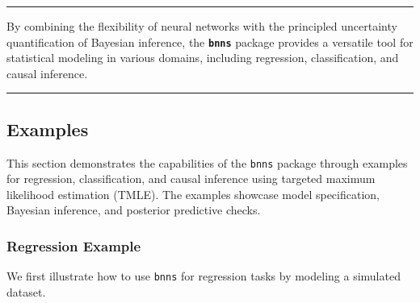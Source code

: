 \documentclass[
]{jss}
\begin{document}
\begin{center}\rule{0.5\linewidth}{0.5pt}\end{center}

By combining the flexibility of neural networks with the principled
uncertainty quantification of Bayesian inference, the
\textbf{\texttt{bnns}} package provides a versatile tool for statistical
modeling in various domains, including regression, classification, and
causal inference.

\begin{center}\rule{0.5\linewidth}{0.5pt}\end{center}

\subsection{Examples}\label{examples}

This section demonstrates the capabilities of the \texttt{bnns} package
through examples for regression, classification, and causal inference
using targeted maximum likelihood estimation (TMLE). The examples
showcase model specification, Bayesian inference, and posterior
predictive checks.

\subsubsection{Regression Example}\label{regression-example}

We first illustrate how to use \texttt{bnns} for regression tasks by
modeling a simulated dataset.
\end{document}
